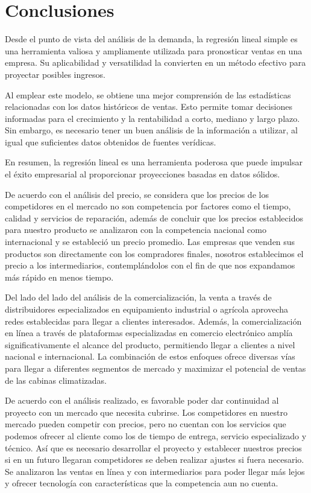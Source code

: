 
\chapter{Conclusiones}
Desde el punto de vista del análisis de la demanda, la regresión lineal simple es una herramienta valiosa y ampliamente utilizada para pronosticar ventas en una empresa. Su aplicabilidad y versatilidad la convierten en un método efectivo para proyectar posibles ingresos.

Al emplear este modelo, se obtiene una mejor comprensión de las estadísticas relacionadas con los datos históricos de ventas. Esto permite tomar decisiones informadas para el crecimiento y la rentabilidad a corto, mediano y largo plazo. Sin embargo, es necesario tener un buen análisis de la información a utilizar, al igual que suficientes datos obtenidos de fuentes verídicas.

En resumen, la regresión lineal es una herramienta poderosa que puede impulsar el éxito empresarial al proporcionar proyecciones basadas en datos sólidos.

De acuerdo con el análisis del precio, se considera que los precios de los competidores en el mercado no son competencia por factores como el tiempo, calidad y servicios de reparación, además de concluir que los precios establecidos para nuestro producto se analizaron con la competencia nacional como internacional y se estableció un precio promedio. Las empresas que venden sus productos son directamente con los compradores finales, nosotros establecimos el precio a los intermediarios, contemplándolos con el fin de que nos expandamos más rápido en menos tiempo.

Del lado del lado del análisis de la comercialización, la venta a través de distribuidores especializados en equipamiento industrial o agrícola aprovecha redes establecidas para llegar a clientes interesados. Además, la comercialización en línea a través de plataformas especializadas en comercio electrónico amplía significativamente el alcance del producto, permitiendo llegar a clientes a nivel nacional e internacional. La combinación de estos enfoques ofrece diversas vías para llegar a diferentes segmentos de mercado y maximizar el potencial de ventas de las cabinas climatizadas.

De acuerdo con el análisis realizado, es favorable poder dar continuidad al proyecto con un mercado que necesita cubrirse. 	Los competidores en nuestro mercado pueden competir con precios, pero no cuentan con los servicios que podemos ofrecer al cliente como los de tiempo de entrega, servicio especializado y técnico. Así que es necesario desarrollar el proyecto y establecer nuestros precios si en un futuro llegaran competidores se deben realizar ajustes si fuera necesario. Se analizaron las ventas en línea y con intermediarios para poder llegar más lejos y ofrecer tecnología con características que la competencia aun no cuenta.






